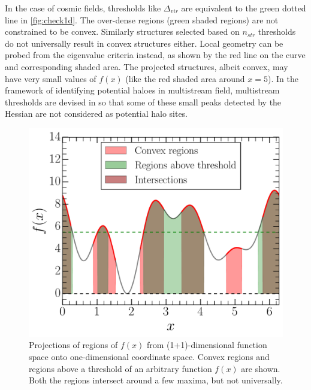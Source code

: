 \documentclass[fleqn,usenatbib,useAMS]{mnras}
\begin{document}
In the case of cosmic fields, thresholds like $\Delta_{vir}$ are equivalent to the green dotted line in \autoref{fig:check1d}. The over-dense regions (green shaded regions) are not constrained to be convex. Similarly structures selected based on $n_{str}$ thresholds do not universally result in convex structures either. Local geometry can be probed from the eigenvalue criteria instead, as shown by the red line on the curve and corresponding shaded area. The projected structures, albeit convex, may have very small values of $f(x)$ (like the red shaded area around $x=5$). In the framework of identifying potential haloes in multistream field, multistream thresholds are devised in so that some of these small peaks detected by the Hessian are not considered as potential halo sites.

\begin{figure}
\begin{minipage}[t]{.99\linewidth}
  \centering\includegraphics[width=8.cm]{fig15.pdf} 
\end{minipage}\hfill
\caption{Projections of regions of $f(x)$ from (1+1)-dimensional function space onto one-dimensional coordinate space. Convex regions and regions above a threshold of an arbitrary function $f(x)$ are shown. Both the regions intersect around a few maxima, but not universally.}
\label{fig:check1d}
\end{figure}



\label{lastpage}
\end{document}
